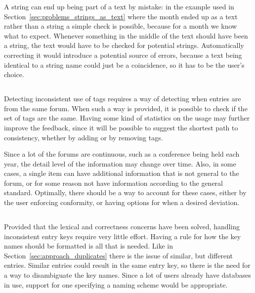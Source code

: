 A {\bibtex} string can end up being part of a text by mistake: in the
example used in Section~\ref{sec:problems_strings_as_text} where the
month ended up as a text rather than a string a simple check is
possible, because for a month we know what to expect.  Whenever
something in the middle of the text should have been a string, the
text would have to be checked for potential strings.  Automatically
correcting it would introduce a potential source of errors, because a
text being identical to a string name could just be a coincidence, so
it has to be the user's choice.


\subsection{}

Detecting inconsistent use of tags requires a way of detecting when
entries are from the same forum.  When such a way is provided, it is
possible to check if the set of tags are the same.  Having some kind
of statistics on the usage may further improve the feedback, since it
will be possible to suggest the shortest path to consistency, whether
by adding or by removing tags.

Since a lot of the forums are continuous, such as a conference being
held each year, the detail level of the information may change over
time.  Also, in some cases, a single item can have additional
information that is not general to the forum, or for some reason not
have information according to the general standard.  Optimally, there
should be a way to account for these cases, either by the user
enforcing conformity, or having options for when a desired deviation.


\subsection{}

Provided that the lexical and correctness concerns have been solved,
handling inconsistent entry keys require very little effort.  Having a
rule for how the key names should be formatted is all that is needed.
Like in Section~\ref{sec:approach_duplicates} there is the issue of
similar, but different entries.  Similar entries could result in the
same entry key, so there is the need for a way to disambiguate the key
names.  Since a lot of users already have databases in use, support
for one specifying a naming scheme would be appropriate.


